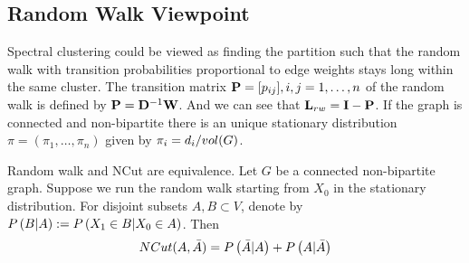 \subsection{Random Walk Viewpoint}

Spectral clustering could be viewed as finding the partition such that the random walk with transition probabilities proportional to edge weights stays long within the same cluster. The transition matrix $\mat{P}=[p_{ij}],i,j=1,\dotsc,n$ of the random walk is defined by $\mat{P}=\mat{D}\inv\mat{W}$. And we can see that $\mat{L}_{rw}=\mat{I}-\mat{P}$. If the graph is connected and non-bipartite there is an unique stationary distribution $\pi=(\pi_1,\dotsc,\pi_n)$ given by $\pi_i=\pfrac{d_i}{vol(G)}$.

Random walk and NCut are equivalence. Let $G$ be a connected non-bipartite graph. Suppose we run the random walk starting from $X_0$ in the stationary distribution. For disjoint subsets $A,B\subset V$, denote by $\P{B|A}:=\P{X_1\in B|X_0\in A}$. Then
\begin{align*}
NCut(A,\bar{A})=\P{\bar{A}|A}+\P{A|\bar{A}}
\end{align*}
